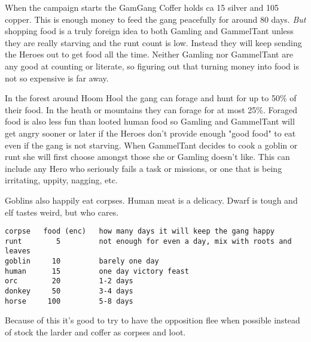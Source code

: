 When the campaign starts the GamGang Coffer holds ca 15 silver and 105 copper. This is enough money to feed the gang peacefully for around 80 days. \emph{But} shopping food is a truly foreign idea to both Gamling and GammelTant unless they are really starving and the runt count is low. Instead they will keep sending the Heroes out to get food all the time. Neither Gamling nor GammelTant are any good at counting or literate, so figuring out that turning money into food is not so expensive is far away.

In the forest around Hoom Hool the gang can forage and hunt for up to 50\% of their food. In the heath or mountains they can forage for at most 25\%. Foraged food is also less fun than looted human food so Gamling and GammelTant will get angry sooner or later if the Heroes don't provide enough "good food" to eat even if the gang is not starving.
When GammelTant decides to cook a goblin or runt she will first choose amongst those she or Gamling doesn't like. This can include any Hero who seriously fails a task or missions, or one that is being irritating, uppity, nagging, etc.

Goblins also happily eat corpses. Human meat is a delicacy. Dwarf is tough and elf tastes weird, but who cares.
\goodbreak \small \begin{samepage} \begin{verbatim}
corpse   food (enc)   how many days it will keep the gang happy
runt        5         not enough for even a day, mix with roots and leaves
goblin     10         barely one day
human      15         one day victory feast
orc        20         1-2 days
donkey     50         3-4 days
horse     100         5-8 days
\end{verbatim} \end{samepage} \normalsize
Because of this it's good to try to have the opposition flee when possible instead of stock the larder and coffer as corpses and loot.

%

%

